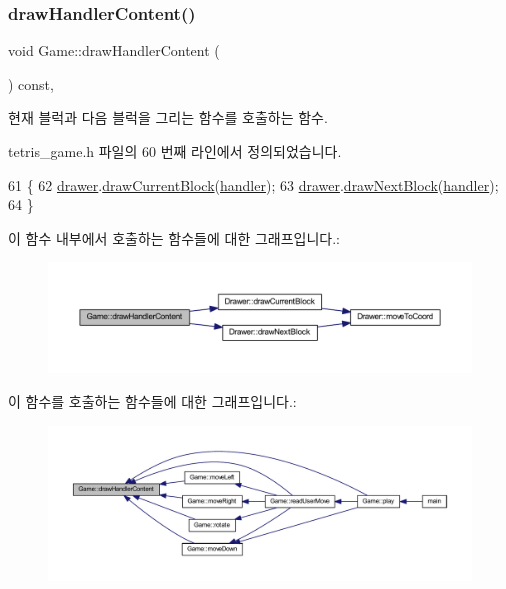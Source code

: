 \subsubsection{\texorpdfstring{draw\+Handler\+Content()}{drawHandlerContent()}}
{\footnotesize\ttfamily void Game\+::draw\+Handler\+Content (\begin{DoxyParamCaption}{ }\end{DoxyParamCaption}) const\hspace{0.3cm}{\ttfamily [inline]}, {\ttfamily [private]}}



현재 블럭과 다음 블럭을 그리는 함수를 호출하는 함수. 



tetris\+\_\+game.\+h 파일의 60 번째 라인에서 정의되었습니다.


\begin{DoxyCode}
61     \{
62         \mbox{\hyperlink{class_game_a045e1468514c0c0d51e968364e0678ad}{drawer}}.\mbox{\hyperlink{class_drawer_acef9be5772c0a3bdbae4f01d851e60f1}{drawCurrentBlock}}(\mbox{\hyperlink{class_game_ae72b7259125e83dfd258c6a132394eec}{handler}});
63         \mbox{\hyperlink{class_game_a045e1468514c0c0d51e968364e0678ad}{drawer}}.\mbox{\hyperlink{class_drawer_a6d8f74fa5fae96990547abb2521b5432}{drawNextBlock}}(\mbox{\hyperlink{class_game_ae72b7259125e83dfd258c6a132394eec}{handler}});
64     \}
\end{DoxyCode}
이 함수 내부에서 호출하는 함수들에 대한 그래프입니다.\+:
\nopagebreak
\begin{figure}[H]
\begin{center}
\leavevmode
\includegraphics[width=350pt]{class_game_aa61075838d60bc5c850b72bc4804b7b8_cgraph}
\end{center}
\end{figure}
이 함수를 호출하는 함수들에 대한 그래프입니다.\+:
\nopagebreak
\begin{figure}[H]
\begin{center}
\leavevmode
\includegraphics[width=350pt]{class_game_aa61075838d60bc5c850b72bc4804b7b8_icgraph}
\end{center}
\end{figure}
\mbox{\label{class_game_a7ab3d17dc7bf72f0a59fbb7b17c6ce5a}} 
